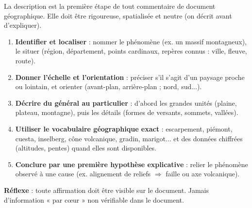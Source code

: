 \documentclass[11pt]{article}
\newcommand{\cle}[1]{{\popxbold\color{popdark}#1}}
\begin{document}
\begin{methode}
La description est la première étape de tout commentaire de document géographique. Elle doit être \cle{rigoureuse}, \cle{spatialisée} et \cle{neutre} (on décrit avant d'expliquer).
\begin{enumerate}
\item \textbf{Identifier et localiser} : nommer le phénomène (ex. un massif montagneux), le situer (région, département, points cardinaux, repères connus : ville, fleuve, route).
\item \textbf{Donner l'échelle et l'orientation} : préciser s'il s'agit d'un paysage proche ou lointain, et orienter (avant-plan, arrière-plan ; nord, sud...).
\item \textbf{Décrire du général au particulier} : d'abord les grandes unités (plaine, plateau, montagne), puis les détails (formes de versants, sommets, vallées).
\item \textbf{Utiliser le vocabulaire géographique exact} : escarpement, piémont, cuesta, inselberg, cône volcanique, gradin, marigot... et des \cle{données chiffrées} (altitudes, pentes) quand elles sont disponibles.
\item \textbf{Conclure par une première hypothèse explicative} : relier le phénomène observé à une cause (ex. alignement de reliefs $\Rightarrow$ faille ou axe volcanique).
\end{enumerate}
\textbf{Réflexe} : toute affirmation doit être visible sur le document. Jamais d'information « par cœur » non vérifiable dans le document.
\end{methode}
\end{document}
